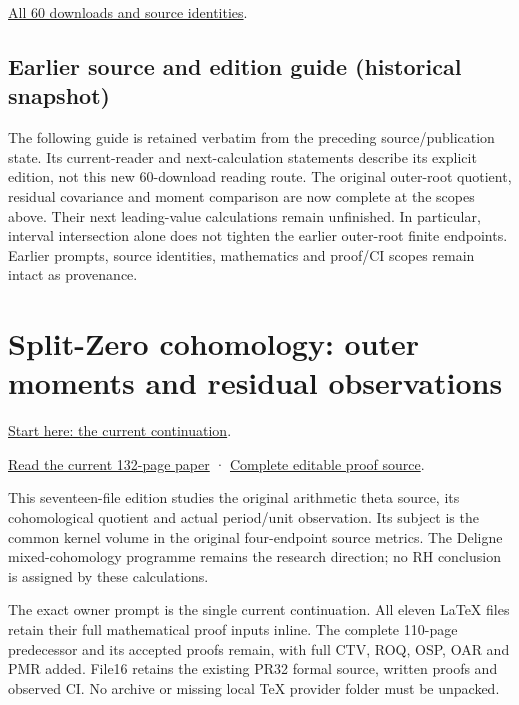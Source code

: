 \documentclass[
]{article}
\begin{document}
\href{calculation_edition_20260915_quotient_moments/README.md}{All 60
downloads and source identities}.

\subsection{Earlier source and edition guide (historical
snapshot)}\label{earlier-source-and-edition-guide-historical-snapshot-8}

The following guide is retained verbatim from the preceding
source/publication state. Its current-reader and next-calculation
statements describe its explicit edition, not this new 60-download
reading route. The original outer-root quotient, residual covariance and
moment comparison are now complete at the scopes above. Their next
leading-value calculations remain unfinished. In particular, interval
intersection alone does not tighten the earlier outer-root finite
endpoints. Earlier prompts, source identities, mathematics and proof/CI
scopes remain intact as provenance.

\section{Split-Zero cohomology: outer moments and residual
observations}\label{split-zero-cohomology-outer-moments-and-residual-observations-1}

\href{https://github.com/KokunoYumeto/zeta-function-research-reader/blob/main/workbenches/splitzero-tandem/continuations/20260915-quotient-moment-continuation/00_CONTINUE_HERE.md}{Start
here: the current continuation}.

\href{https://github.com/KokunoYumeto/zeta-function-research-reader/blob/main/workbenches/splitzero-tandem/continuations/20260915-quotient-moment-continuation/15_CURRENT_MIXED_CONTROL_READER.pdf}{Read
the current 132-page paper} ·
\href{https://github.com/KokunoYumeto/zeta-function-research-reader/blob/main/workbenches/splitzero-tandem/continuations/20260915-quotient-moment-continuation/14_CURRENT_KERNEL_AND_MULTIPLICITY_PROOFS.tex}{Complete
editable proof source}.

This seventeen-file edition studies the original arithmetic theta
source, its cohomological quotient and actual period/unit observation.
Its subject is the common kernel volume in the original four-endpoint
source metrics. The Deligne mixed-cohomology programme remains the
research direction; no RH conclusion is assigned by these calculations.

The exact owner prompt is the single current continuation. All eleven
LaTeX files retain their full mathematical proof inputs inline. The
complete 110-page predecessor and its accepted proofs remain, with full
CTV, ROQ, OSP, OAR and PMR added. File16 retains the existing PR32
formal source, written proofs and observed CI. No archive or missing
local TeX provider folder must be unpacked.
\end{document}
